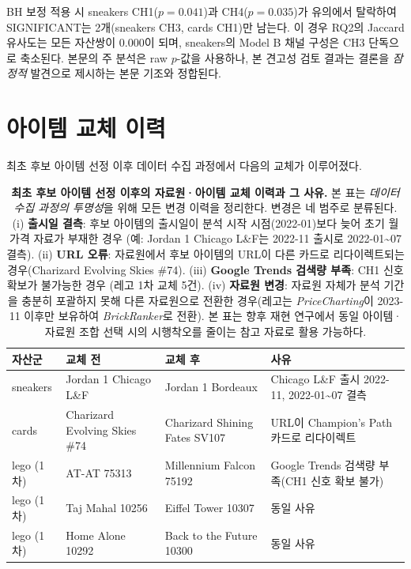 \documentclass[11pt, a4paper, twocolumn]{article}
\begin{document}
BH 보정 적용 시 sneakers CH1($p=0.041$)과 CH4($p=0.035$)가 유의에서
탈락하여 SIGNIFICANT는 2개(sneakers CH3, cards CH1)만 남는다.
이 경우 RQ2의 Jaccard 유사도는 모든 자산쌍이 0.000이 되며, sneakers의
Model B 채널 구성은 CH3 단독으로 축소된다. 본문의 주 분석은 raw
$p$-값을 사용하나, 본 견고성 검토 결과는 결론을 \emph{잠정적} 발견으로
제시하는 본문 기조와 정합된다.

\section{아이템 교체 이력}\label{sec:appendix-items}

최초 후보 아이템 선정 이후 데이터 수집 과정에서 다음의 교체가 이루어졌다.

\begin{table}[!tbp]
\centering\small
\caption[아이템 교체 이력 및 사유]{\textbf{최초 후보 아이템 선정
이후의 자료원·아이템 교체 이력과 그 사유.} 본 표는 \emph{데이터
수집 과정의 투명성}을 위해 모든 변경 이력을 정리한다. 변경은 네
범주로 분류된다. (i) \textbf{출시일 결측}: 후보 아이템의 출시일이
분석 시작 시점(2022-01)보다 늦어 초기 월 가격 자료가 부재한 경우
(예: Jordan 1 Chicago L\&F는 2022-11 출시로 2022-01\textasciitilde07
결측). (ii) \textbf{URL 오류}: 자료원에서 후보 아이템의 URL이 다른
카드로 리다이렉트되는 경우(Charizard Evolving Skies \#74). (iii)
\textbf{Google Trends 검색량 부족}: CH1 신호 확보가 불가능한 경우
(레고 1차 교체 5건). (iv) \textbf{자료원 변경}: 자료원 자체가 분석
기간을 충분히 포괄하지 못해 다른 자료원으로 전환한 경우(레고는
\emph{PriceCharting}이 2023-11 이후만 보유하여 \emph{BrickRanker}로
전환). 본 표는 향후 재현 연구에서 동일 아이템·자료원 조합 선택
시의 시행착오를 줄이는 참고 자료로 활용 가능하다.}
\label{tab:item-history}
\begin{tabular}{lp{3.4cm}p{3.2cm}p{5.8cm}}
\toprule
자산군 & 교체 전 & 교체 후 & 사유 \\
\midrule
sneakers & Jordan 1 Chicago L\&F & Jordan 1 Bordeaux & Chicago L\&F 출시 2022-11, 2022-01\textasciitilde07 결측 \\
cards & Charizard Evolving Skies \#74 & Charizard Shining Fates SV107 & URL이 Champion's Path 카드로 리다이렉트 \\
\midrule
lego (1차) & AT-AT 75313 & Millennium Falcon 75192 & Google Trends 검색량 부족(CH1 신호 확보 불가) \\
lego (1차) & Taj Mahal 10256 & Eiffel Tower 10307 & 동일 사유 \\
lego (1차) & Home Alone 10292 & Back to the Future 10300 & 동일 사유 \\

\end{tabular}
\end{table}
\end{document}
